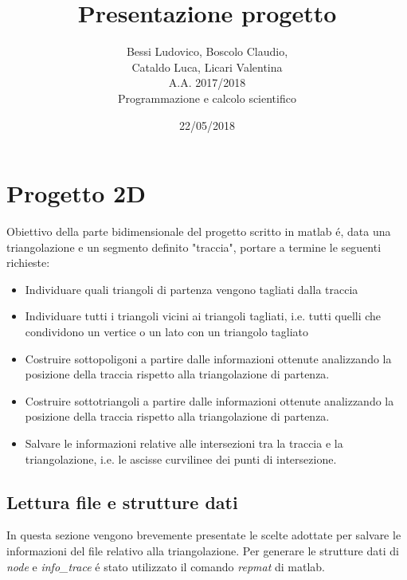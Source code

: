 \documentclass[11pt, a4paper]{article}
\begin{document}
\author{Bessi Ludovico, Boscolo Claudio,\\ Cataldo Luca, Licari Valentina\\ A.A. 2017/2018\\Programmazione e calcolo scientifico}
\title{Presentazione progetto\\}
\date{22/05/2018}
\maketitle
\tableofcontents
\newpage

\section{Progetto 2D}
Obiettivo della parte bidimensionale del progetto scritto in matlab \'e, data una triangolazione e un segmento definito "traccia", portare a termine le seguenti richieste:
\begin{itemize}
    \item Individuare quali triangoli di partenza vengono tagliati dalla traccia
    \item Individuare tutti i triangoli vicini ai triangoli tagliati, i.e. tutti quelli che condividono un vertice o un lato con un triangolo tagliato
    \item Costruire sottopoligoni a partire dalle informazioni ottenute analizzando la posizione della traccia rispetto alla triangolazione di partenza.
    \item Costruire sottotriangoli a partire dalle informazioni ottenute analizzando la posizione della traccia rispetto alla triangolazione di partenza.
    \item Salvare le informazioni relative alle intersezioni tra la traccia e la triangolazione, i.e. le ascisse curvilinee dei punti di intersezione.
\end{itemize}
\subsection{Lettura file e strutture dati}
In questa sezione vengono brevemente presentate le scelte adottate per salvare le informazioni del file relativo alla triangolazione. Per generare le strutture dati di \textit{node} e \textit{info\_trace} \'e stato utilizzato il comando \textit{repmat} di matlab.
\end{document}
